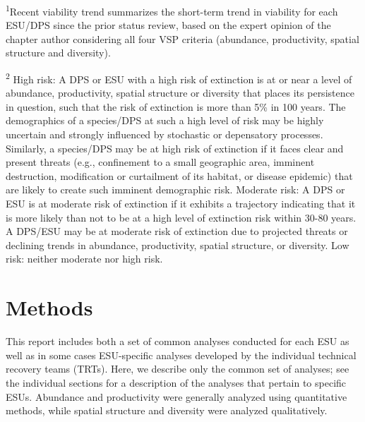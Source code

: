 \documentclass[
  letterpaper,
  oneside,
  open=any]{scrbook}
\begin{document}
\textsuperscript{1}Recent viability trend summarizes the short-term
trend in viability for each ESU/DPS since the prior status review, based
on the expert opinion of the chapter author considering all four VSP
criteria (abundance, productivity, spatial structure and diversity).

\textsuperscript{2} High risk: A DPS or ESU with a high risk of
extinction is at or near a level of abundance, productivity, spatial
structure or diversity that places its persistence in question, such
that the risk of extinction is more than 5\% in 100 years. The
demographics of a species/DPS at such a high level of risk may be highly
uncertain and strongly influenced by stochastic or depensatory
processes. Similarly, a species/DPS may be at high risk of extinction if
it faces clear and present threats (e.g., confinement to a small
geographic area, imminent destruction, modification or curtailment of
its habitat, or disease epidemic) that are likely to create such
imminent demographic risk. Moderate risk: A DPS or ESU is at moderate
risk of extinction if it exhibits a trajectory indicating that it is
more likely than not to be at a high level of extinction risk within
30-80 years. A DPS/ESU may be at moderate risk of extinction due to
projected threats or declining trends in abundance, productivity,
spatial structure, or diversity. Low risk: neither moderate nor high
risk.


\hypertarget{methods}{%
\chapter{Methods}\label{methods}}

This report includes both a set of common analyses conducted for each
ESU as well as in some cases ESU-specific analyses developed by the
individual technical recovery teams (TRTs). Here, we describe only the
common set of analyses; see the individual sections for a description of
the analyses that pertain to specific ESUs. Abundance and productivity
were generally analyzed using quantitative methods, while spatial
structure and diversity were analyzed qualitatively.
\end{document}
